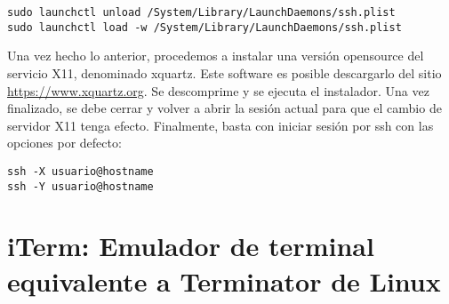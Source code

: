 \begin{lstlisting}
sudo launchctl unload /System/Library/LaunchDaemons/ssh.plist
sudo launchctl load -w /System/Library/LaunchDaemons/ssh.plist
\end{lstlisting}

Una vez hecho lo anterior, procedemos a instalar una versión opensource del servicio X11, denominado xquartz. Este software es posible descargarlo del sitio \url{https://www.xquartz.org}. Se descomprime y se ejecuta el instalador. Una vez finalizado, se debe cerrar y volver a abrir la sesión actual para que el cambio de servidor X11 tenga efecto. Finalmente, basta con iniciar sesión por ssh con las opciones por defecto:

\begin{lstlisting}
ssh -X usuario@hostname
ssh -Y usuario@hostname
\end{lstlisting}

\section{iTerm: Emulador de terminal equivalente a Terminator de Linux}


\clearpage